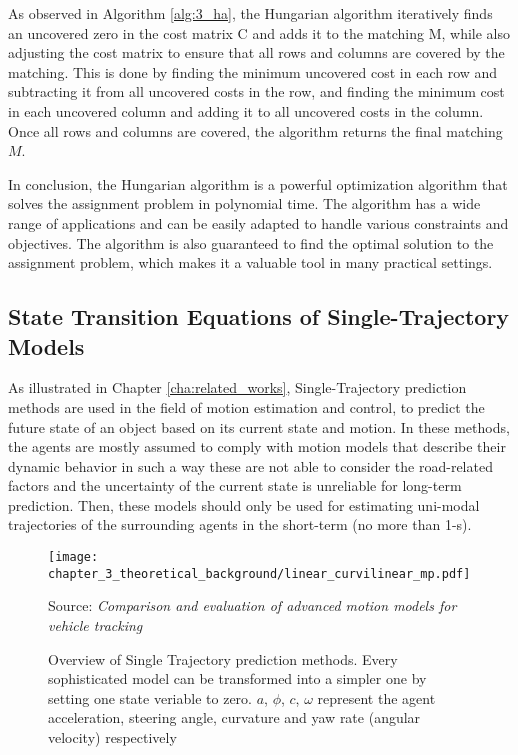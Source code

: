 As observed in Algorithm \ref{alg:3_ha}, the Hungarian algorithm iteratively finds an uncovered zero in the cost matrix C and adds it to the matching M, while also adjusting the cost matrix to ensure that all rows and columns are covered by the matching. This is done by finding the minimum uncovered cost in each row and subtracting it from all uncovered costs in the row, and finding the minimum cost in each uncovered column and adding it to all uncovered costs in the column. Once all rows and columns are covered, the algorithm returns the final matching $M$.

In conclusion, the Hungarian algorithm is a powerful optimization algorithm that solves the assignment problem in polynomial time. The algorithm has a wide range of applications and can be easily adapted to handle various constraints and objectives. The algorithm is also guaranteed to find the optimal solution to the assignment problem, which makes it a valuable tool in many practical settings.
	
\subsection{State Transition Equations of Single-Trajectory Models}
\label{subsec:3_state_transitions_single_traj}

As illustrated in Chapter \ref{cha:related_works}, Single-Trajectory prediction methods are used in the field of motion estimation and control, to predict the future state of an object based on its current state and motion. In these methods, the agents are mostly assumed to comply with motion models that describe their dynamic behavior in such a way these are not able to consider the road-related factors and the uncertainty of the current state is unreliable for long-term prediction. Then, these models should only be used for estimating uni-modal trajectories of the surrounding agents in the short-term (no more than 1-s).

\begin{figure}[h]
	\centering
	\texttt{[image: chapter\_3\_theoretical\_background/linear\_curvilinear\_mp.pdf]}
	\caption[Overview of Single Trajectory prediction methods]{Overview of Single Trajectory prediction methods. Every sophisticated model can be transformed into a simpler one by setting one state veriable to zero. $a$, $\phi$, $c$, $\omega$ represent the agent acceleration, steering angle, curvature and yaw rate (angular velocity) respectively}
	Source: \textit{Comparison and evaluation of advanced motion models for vehicle tracking} \cite{schubert2008comparison}
	\label{fig:chapter_3_theoretical_background/linear_curvilinear_mp}
\end{figure}

